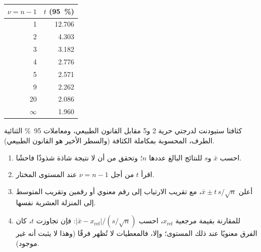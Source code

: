 \begin{omfigure}
\begin{minipage}[c]{0.56\linewidth}
\end{minipage}\hfill
\begin{minipage}[c]{0.4\linewidth}\centering
\small
\begin{tabular}{rr}
\hline
$\nu = n - 1$ & $t$ (95~\%) \\
\hline
1 & 12.706 \\
2 & 4.303 \\
3 & 3.182 \\
4 & 2.776 \\
5 & 2.571 \\
9 & 2.262 \\
20 & 2.086 \\
$\infty$ & 1.960 \\
\hline
\end{tabular}
\end{minipage}
\par\vspace{4pt}

{\small كثافتا ستيودنت لدرجتي حرية 2 و5 مقابل القانون الطبيعي، ومعاملات 95~\%
الثنائية الطرف، المحسوبة بمكاملة الكثافة (والسطر الأخير هو القانون الطبيعي).}
\end{omfigure}

\begin{method}\label{met:b2:measurement-statistics:confidence-interval}
\begin{enumerate}
  \item احسب $\bar x$ و$s$ للنتائج البالغ عددها $n$؛ وتحقق من أن لا نتيجة شاذة شذوذًا فاحشًا.
  \item اقرأ $t$ من أجل $\nu = n - 1$ عند المستوى المختار.
  \item أعلن $\bar x \pm t\,s/\sqrt n$، مع تقريب الارتياب إلى رقم معنوي أو رقمين
        وتقريب المتوسط إلى المنزلة العشرية نفسها.
  \item للمقارنة بقيمة مرجعية $x_{\mathrm{ref}}$، احسب $|\bar x - x_{\mathrm{ref}}|/(s/\sqrt
        n)$: فإن تجاوزت $t$، كان الفرق معنويًا عند ذلك المستوى؛ وإلا، فالمعطيات لا تُظهر
        فرقًا (وهذا لا يثبت أنه غير موجود).
\end{enumerate}
\end{method}

